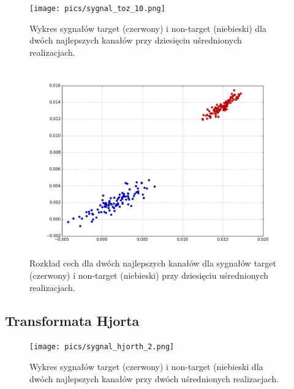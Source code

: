 \documentclass[licencjacka,openright]{pracamgr}
\begin{document}
\begin{figure}[H]
\centering
\texttt{[image: pics/sygnal\_toz\_10.png]}
\caption{Wykres sygnałów target (czerwony) i non-target (niebieski) dla dwóch najlepszych kanałów przy dziesięciu uśrednionych realizacjach.}
\label{sygnal_toz_10}
\end{figure}

\begin{figure}[H]
\centering
\includegraphics[scale=0.55, trim=0mm 0mm 0mm 0mm, clip=True]{pics/cecha_toz_10.png}
\caption{Rozkład cech dla dwóch najlepszych kanałów dla sygnałów target (czerwony) i non-target (niebieski) przy dziesięciu uśrednionych realizacjach.}
\label{cecha_toz_10}
\end{figure}



\subsection{Transformata Hjorta}

\begin{figure}[H]
\centering
\texttt{[image: pics/sygnal\_hjorth\_2.png]}
\caption{Wykres sygnałów target (czerwony) i non-target (niebieski dla dwóch najlepszych kanałów przy dwóch uśrednionych realizacjach.}
\label{sygnal_hjorth_2}
\end{figure}
\end{document}
